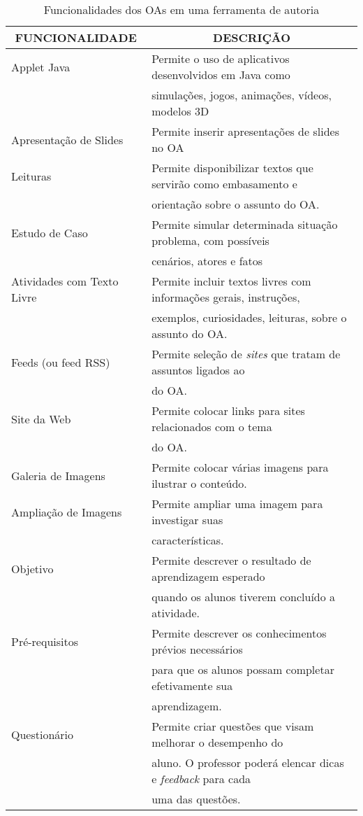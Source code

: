 \begin{table}[htbp]
	\caption{Funcionalidades dos OAs em uma ferramenta de autoria}
	\begin{tabular}{|l|l|}
		\hline
		\multicolumn{1}{|c|}{\textbf{FUNCIONALIDADE}} & \multicolumn{1}{c|}{\textbf{DESCRIÇÃO}} \\ \hline
		Applet Java & Permite o uso de aplicativos desenvolvidos em Java como \\ &simulações, jogos, animações, vídeos, modelos 3D \\ \hline
		Apresentação de Slides & Permite inserir apresentações de slides no OA \\ \hline
		Leituras & Permite disponibilizar textos que servirão como embasamento e \\ &orientação sobre o assunto do OA. \\ \hline
		Estudo de Caso & Permite simular determinada situação problema, com possíveis \\ &cenários, atores e fatos \\ \hline
		Atividades com Texto Livre & Permite incluir textos livres com informações gerais, instruções, \\ &exemplos, curiosidades, leituras, sobre o assunto do OA.  \\ \hline
		Feeds (ou feed RSS) & Permite seleção de \textit{sites} que tratam de assuntos ligados ao \\&do OA.  \\ \hline
		Site da Web & Permite colocar links para sites relacionados com o tema \\&do OA. \\ \hline
		Galeria de Imagens & Permite colocar várias imagens para ilustrar o conteúdo. \\ \hline
		Ampliação de Imagens & Permite ampliar uma imagem para investigar suas \\&características. \\ \hline
		Objetivo & Permite descrever o resultado de aprendizagem esperado \\ &quando os alunos tiverem concluído a atividade.  \\ \hline
		Pré-requisitos & Permite descrever os conhecimentos prévios necessários \\ &para que os alunos possam completar efetivamente sua \\ &aprendizagem. \\ \hline
		Questionário & Permite criar questões que visam melhorar o desempenho do \\ &aluno. O professor poderá elencar dicas e \textit{feedback} para cada \\ &uma das questões. \\ \hline

\end{tabular}
\end{table}
